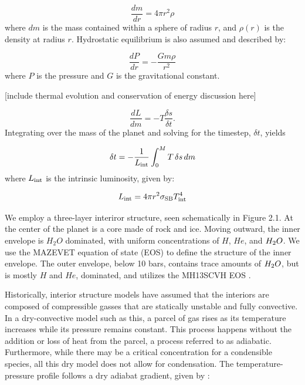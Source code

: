 \documentclass[11pt]{ucscthesisbs}
\begin{document}
\begin{equation}
  \frac{dm}{dr} =4 \pi r^{2}\rho  
\end{equation}
where $dm$ is the mass contained within a sphere of radius $r$, and $\rho(r)$ is the density at radius $r$. Hydrostatic equilibrium is also assumed and described by:

\begin{equation}
  \frac{dP}{dr} = -\frac{Gm\rho}{r^{2}}  
\end{equation}
where $P$ is the pressure and $G$ is the gravitational constant. 

[include thermal evolution and conservation of energy discussion here]

\begin{equation}
  \frac{dL}{dm}=-T\frac{\delta s}{\delta t}.
\end{equation}
Integrating over the mass of the planet and solving for the timestep, $\delta t$, yields

\begin{equation}
  \delta t=-\frac{1}{L_{\rm int}}\int_0^M T\,\delta s\,dm
\end{equation}
where $L_{\rm int}$ is the intrinsic luminosity, given by:

\begin{equation}
  L_{\rm int} = 4\pi r^{2}\sigma_{\rm SB}T_{\rm int}^{4}
\end{equation}

We employ a three-layer interiror structure, seen schematically in Figure 2.1. At the center of the planet is a core made of rock and ice. Moving outward, the inner envelope is $H_{2}O$ dominated, with uniform concentrations of $H$, $He$, and $H_{\rm{2}}O$. We use the MAZEVET equation of state (EOS) \citep{mazevet_2019} to define the structure of the inner envelope. The outer envelope, below 10 bars, contains trace amounts of $H_{\rm{2}}O$, but is mostly $H$ and $He$, dominated, and utilizes the MH13SCVH EOS \citep{miguel_2018}. 

Historically, interior structure models have assumed that the interiors are composed of compressible gasses that are statically unstable and fully convective. In a dry-convective model such as this, a parcel of gas rises as its temperature increases while its pressure remains constant. This process happens without the addition or loss of heat from the parcel, a process referred to as adiabatic. Furthermore, while there may be a critical concentration for a condensible species, all this dry model does not allow for condensation. The temperature-pressure profile follows a dry adiabat gradient\citep{kippenhahn_2012}, given by :
\end{document}
